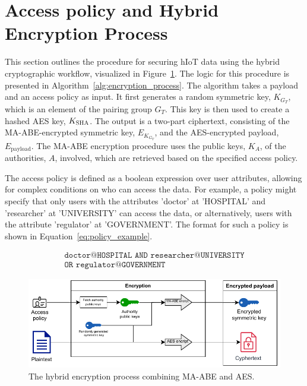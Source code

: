 \documentclass[cic,tc,english]{iiufrgs}
\numberwithin{algorithm}{chapter}
\begin{document}
    \section{Access policy and Hybrid Encryption Process}
        \label{sec:hybrid_encryption}

        This section outlines the procedure for securing hIoT data using the hybrid cryptographic workflow, visualized in Figure~\ref{fig:encryption_diagram}. The logic for this procedure is presented in Algorithm~\ref{alg:encryption_process}. The algorithm takes a payload and an access policy as input. It first generates a random symmetric key, $K_{G_T}$, which is an element of the pairing group $G_T$. This key is then used to create a hashed AES key, $K_{\textsc{SHA}}$. The output is a two-part ciphertext, consisting of the MA-ABE-encrypted symmetric key, $E_{K_{G_T}}$, and the AES-encrypted payload, $E_{\text{payload}}$. The MA-ABE encryption procedure uses the public keys, $K_A$, of the authorities, $A$, involved, which are retrieved based on the specified access policy. 

        The access policy is defined as a boolean expression over user attributes, allowing for complex conditions on who can access the data. For example, a policy might specify that only users with the attributes 'doctor' at 'HOSPITAL' and 'researcher' at 'UNIVERSITY' can access the data, or alternatively, users with the attribute 'regulator' at 'GOVERNMENT'. The format for such a policy is shown in Equation~\ref{eq:policy_example}.

        \begin{multline}
            \label{eq:policy_example}
            \texttt{doctor@HOSPITAL AND researcher@UNIVERSITY}\\
            \texttt{OR regulator@GOVERNMENT}
        \end{multline}

        \begin{figure}[h]
            \centering
            \includegraphics[width=\textwidth]{images/diagrams/encryption_diagram.pdf} %
            \caption{The hybrid encryption process combining MA-ABE and AES.}
            \label{fig:encryption_diagram}
        \end{figure}
\end{document}
